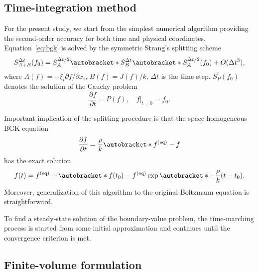 \documentclass[]{elsarticle} %
\newcommand{\pder}[2][]{\frac{\partial#1}{\partial#2}}
\newcommand{\Pder}[2][]{\partial#1/\partial#2}
\newcommand{\OO}[1]{O(#1)}
\DeclarePairedDelimiter\autobracket()       %
\newcommand{\br}[1]{\autobracket*{#1}}
\newcommand{\equil}[1]{#1^\mathrm{(eq)}}
\begin{document}
{\subsection{Time-integration method}\label{sec:numerics:splitting}

For the present study, we start from the simplest numerical algorithm providing the second-order accuracy
for both time and physical coordinates.
Equation~\eqref{eq:bgk} is solved by the symmetric Strang's splitting scheme~\cite{Bobylev2001}
\begin{equation}\label{eq:Strang}
    S^{\Delta{t}}_{A+B}(f_0) = S^{\Delta{t}/2}_A \br{S^{\Delta{t}}_B \br{S^{\Delta{t}/2}_A(f_0)} } + \OO{\Delta{t}^3},
\end{equation}
where \(A(f) = -\xi_i\Pder[f]{x_i}\), \(B(f) = J(f)/k\), \(\Delta{t}\) is the time step.
\(S^t_P (f_0)\) denotes the solution of the Cauchy problem
\begin{equation}\label{eq:Cauchy}
    \pder[f]{t} = P(f), \quad f|_{t=0} = f_0.
\end{equation}

Important implication of the splitting procedure is that the space-homogeneous BGK equation
\begin{equation}\label{eq:bgk_homogeneous}
    \pder[f]{t} = \frac{\rho}k \br{\equil{f}-f}
\end{equation}
has the exact solution
\begin{equation}\label{eq:bgk_exact}
    f(t) = \equil{f} + \br{f(t_0)-\equil{f}}\exp\br{-\frac{\rho}k (t-t_0)}.
\end{equation}
Moreover, generalization of this algorithm to the original Boltzmann equation is straightforward.

To find a steady-state solution of the boundary-value problem,
the time-marching process is started from some initial approximation
and continues until the convergence criterion is met.

\subsection{Finite-volume formulation}\label{sec:numerics:fv}

}
\end{document}
